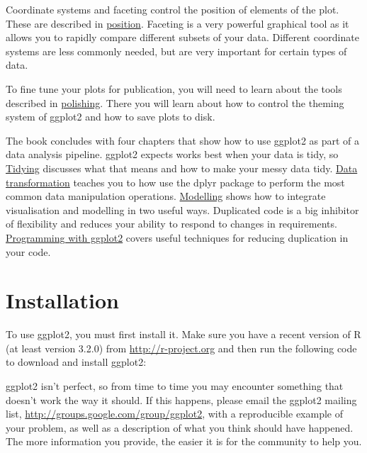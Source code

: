 Coordinate systems and faceting control the position of elements of the
plot. These are described in \hyperref[cha:position]{position}. Faceting
is a very powerful graphical tool as it allows you to rapidly compare
different subsets of your data. Different coordinate systems are less
commonly needed, but are very important for certain types of data.

To fine tune your plots for publication, you will need to learn about
the tools described in \hyperref[cha:polishing]{polishing}. There you
will learn about how to control the theming system of ggplot2 and how to
save plots to disk.

The book concludes with four chapters that show how to use ggplot2 as
part of a data analysis pipeline. ggplot2 expects works best when your
data is tidy, so \hyperref[cha:data]{Tidying} discusses what that means
and how to make your messy data tidy. \hyperref[cha:dplyr]{Data
transformation} teaches you to how use the dplyr package to perform the
most common data manipulation operations.
\hyperref[cha:modelling]{Modelling} shows how to integrate visualisation
and modelling in two useful ways. Duplicated code is a big inhibitor of
flexibility and reduces your ability to respond to changes in
requirements. \hyperref[cha:programming]{Programming with ggplot2}
covers useful techniques for reducing duplication in your code.

\section{Installation}\label{sec:installation}


To use ggplot2, you must first install it. Make sure you have a recent
version of R (at least version 3.2.0) from \url{http://r-project.org}
and then run the following code to download and install ggplot2:

\begin{Shaded}
\begin{Highlighting}[]
\NormalTok{(}\NormalTok{)}
\end{Highlighting}
\end{Shaded}

ggplot2 isn't perfect, so from time to time you may encounter something
that doesn't work the way it should. If this happens, please email the
ggplot2 mailing list, \url{http://groups.google.com/group/ggplot2}, with
a reproducible example of your problem, as well as a description of what
you think should have happened. The more information you provide, the
easier it is for the community to help you.

